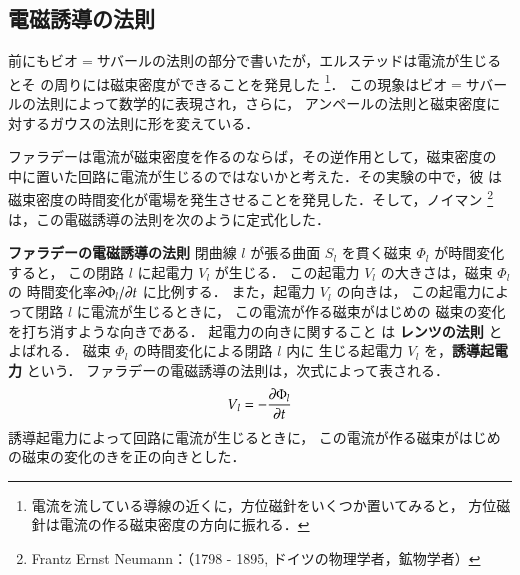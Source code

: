     \subsection{電磁誘導の法則}
            前にもビオ$=$サバールの法則の部分で書いたが，エルステッドは電流が生じるとそ
            の周りには磁束密度ができることを発見した
                \footnote{
                    電流を流している導線の近くに，方位磁針をいくつか置いてみると，
                    方位磁針は電流の作る磁束密度の方向に振れる．
                }．
            この現象はビオ$=$サバールの法則によって数学的に表現され，さらに，
            アンペールの法則と磁束密度に対するガウスの法則に形を変えている．

            ファラデーは電流が磁束密度を作るのならば，その逆作用として，磁束密度の
            中に置いた回路に電流が生じるのではないかと考えた．その実験の中で，彼
            は磁束密度の時間変化が電場を発生させることを発見した．そして，ノイマン
                \footnote{
                    Frantz Ernst Neumann：（1798 - 1895, ドイツの物理学者，鉱物学者）
                }
            は，この電磁誘導の法則を次のように定式化した．\\
                \begin{center}
                    \begin{itembox}[l]{\textbf{ファラデーの電磁誘導の法則}}
                        閉曲線 $l$ が張る曲面 $S_{l}$ を貫く磁束 $\Phi_{l}$ が時間変化すると，
                        この閉路 $l$ に起電力 $V_{l}$ が生じる．
                        この起電力 $V_{l}$ の大きさは，磁束 $\Phi_{l}$ の
                        時間変化率$\partial \Phi_{l}/\partial t$ に比例する．
                        また，起電力 $V_{l}$ の向きは，
                        この起電力によって閉路 $l$ に電流が生じるときに，
                        この電流が作る磁束がはじめの
                        磁束の変化を打ち消すような向きである．
                        起電力の向きに関すること
                        は \textbf{レンツの法則} とよばれる．
                        磁束 $\Phi_{l}$ の時間変化による閉路 $l$ 内に
                        生じる起電力 $V_{l}$ を，\textbf{誘導起電力} という．
                        ファラデーの電磁誘導の法則は，次式によって表される．
                        \begin{align}\label{denjiyudo}
                        V_{l}=-\frac{\rd \Phi_{l}}{\rd t}
                        \end{align}
                        誘導起電力によって回路に電流が生じるときに，
                        この電流が作る磁束がはじめの磁束の変化のきを正の向きとした．
                    \end{itembox}
                \end{center}

